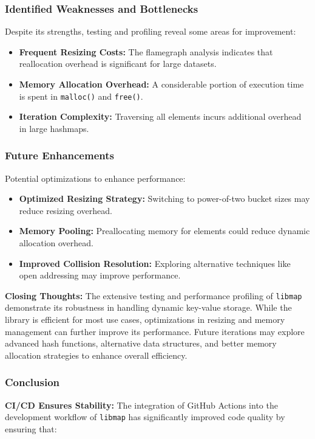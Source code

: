\documentclass[titlepage]{article}
\begin{document}
\subsubsection{Identified Weaknesses and Bottlenecks}
Despite its strengths, testing and profiling reveal some areas for improvement:
\begin{itemize}
    \item \textbf{Frequent Resizing Costs:} The flamegraph analysis indicates that reallocation overhead is significant for large datasets.
    \item \textbf{Memory Allocation Overhead:} A considerable portion of execution time is spent in \texttt{malloc()} and \texttt{free()}.
    \item \textbf{Iteration Complexity:} Traversing all elements incurs additional overhead in large hashmaps.
\end{itemize}

\subsubsection{Future Enhancements}
Potential optimizations to enhance performance:
\begin{itemize}
    \item \textbf{Optimized Resizing Strategy:} Switching to power-of-two bucket sizes may reduce resizing overhead.
    \item \textbf{Memory Pooling:} Preallocating memory for elements could reduce dynamic allocation overhead.
    \item \textbf{Improved Collision Resolution:} Exploring alternative techniques like open addressing may improve performance.
\end{itemize}

\textbf{Closing Thoughts:}
The extensive testing and performance profiling of \texttt{libmap} demonstrate its robustness in handling dynamic key-value storage. While the library is efficient for most use cases, optimizations in resizing and memory management can further improve its performance. Future iterations may explore advanced hash functions, alternative data structures, and better memory allocation strategies to enhance overall efficiency.



\subsubsection{Conclusion}

\textbf{CI/CD Ensures Stability:}  
The integration of GitHub Actions into the development workflow of \texttt{libmap} has significantly improved code quality by ensuring that:
\end{document}
